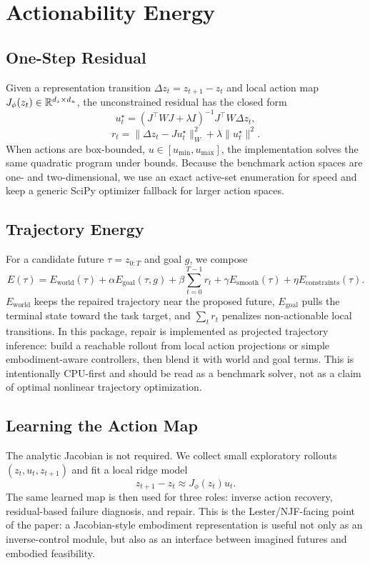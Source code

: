 \section{Actionability Energy}

\subsection{One-Step Residual}
Given a representation transition $\Delta z_t=z_{t+1}-z_t$ and local action map $J_\phi(z_t)\in\mathbb{R}^{d_z\times d_u}$, the unconstrained residual has the closed form
\[
u_t^\star=(J^\top WJ+\lambda I)^{-1}J^\top W\Delta z_t,
\]
\[
r_t=\|\Delta z_t-Ju_t^\star\|_W^2+\lambda\|u_t^\star\|^2.
\]
When actions are box-bounded, $u\in[u_{\min},u_{\max}]$, the implementation solves the same quadratic program under bounds. Because the benchmark action spaces are one- and two-dimensional, we use an exact active-set enumeration for speed and keep a generic SciPy optimizer fallback for larger action spaces.

\subsection{Trajectory Energy}
For a candidate future $\tau=z_{0:T}$ and goal $g$, we compose
\[
E(\tau)=E_{\mathrm{world}}(\tau)+\alpha E_{\mathrm{goal}}(\tau,g)+\beta\sum_{t=0}^{T-1}r_t+\gamma E_{\mathrm{smooth}}(\tau)+\eta E_{\mathrm{constraints}}(\tau).
\]
$E_{\mathrm{world}}$ keeps the repaired trajectory near the proposed future, $E_{\mathrm{goal}}$ pulls the terminal state toward the task target, and $\sum_t r_t$ penalizes non-actionable local transitions. In this package, repair is implemented as projected trajectory inference: build a reachable rollout from local action projections or simple embodiment-aware controllers, then blend it with world and goal terms. This is intentionally CPU-first and should be read as a benchmark solver, not as a claim of optimal nonlinear trajectory optimization.

\subsection{Learning the Action Map}
The analytic Jacobian is not required. We collect small exploratory rollouts $(z_t,u_t,z_{t+1})$ and fit a local ridge model
\[
z_{t+1}-z_t\approx J_\phi(z_t)u_t.
\]
The same learned map is then used for three roles: inverse action recovery, residual-based failure diagnosis, and repair. This is the Lester/NJF-facing point of the paper: a Jacobian-style embodiment representation is useful not only as an inverse-control module, but also as an interface between imagined futures and embodied feasibility.

